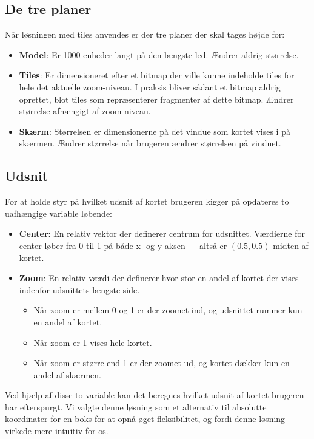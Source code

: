 \subsection{De tre planer}
\label{subsec:deTrePlaner}

Når løsningen med tiles anvendes er der tre planer der skal tages højde for:

\begin{itemize}
	\item \textbf{Model}: Er 1000 enheder langt på den længste led. Ændrer aldrig størrelse.
	\item \textbf{Tiles}: Er dimensioneret efter et bitmap der ville kunne indeholde tiles for hele det aktuelle zoom-niveau. I praksis bliver sådant et bitmap aldrig oprettet, blot tiles som repræsenterer fragmenter af dette bitmap. Ændrer størrelse afhængigt af zoom-niveau.
	\item \textbf{Skærm}: Størrelsen er dimensionerne på det vindue som kortet vises i på skærmen. Ændrer størrelse når brugeren ændrer størrelsen på vinduet.
\end{itemize}

\subsection{Udsnit}
\label{subsec:udsnit}

For at holde styr på hvilket udsnit af kortet brugeren kigger på opdateres to uafhængige variable løbende:

\begin{itemize}
	\item \textbf{Center}: En relativ vektor der definerer centrum for udsnittet. Værdierne for center løber fra 0 til 1 på både x- og y-aksen --- altså er $(0.5, 0.5)$ midten af kortet.
	\item \textbf{Zoom}: En relativ værdi der definerer hvor stor en andel af kortet der vises indenfor udsnittets længste side.
	\begin{itemize}
		\item Når zoom er mellem 0 og 1 er der zoomet ind, og udsnittet rummer kun en andel af kortet.
		\item Når zoom er 1 vises hele kortet.
		\item Når zoom er større end 1 er der zoomet ud, og kortet dækker kun en andel af skærmen.
	\end{itemize}
\end{itemize}

Ved hjælp af disse to variable kan det beregnes hvilket udsnit af kortet brugeren har efterspurgt. Vi valgte denne løsning som et alternativ til absolutte koordinater for en boks for at opnå øget fleksibilitet, og fordi denne løsning virkede mere intuitiv for os.

